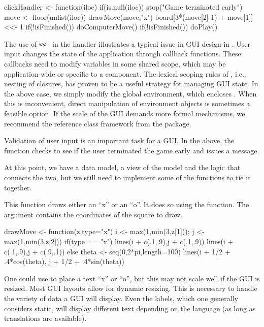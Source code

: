 \begin{Schunk}
\begin{Sinput}
 clickHandler <- function(iloc) {
   if(is.null(iloc)) 
     stop("Game terminated early")
   move <- floor(unlist(iloc))
   drawMove(move,"x")
   board[3*(move[2]-1) + move[1]] <<- 1
   if(!isFinished()) 
     doComputerMove()
   if(!isFinished()) 
     doPlay()
 }
\end{Sinput}
\end{Schunk}

The use of \verb+<<-+ in the handler illustrates a typical issue in
GUI design in \R.  User input changes the state of the application
through callback functions. These callbacks need to modify variables
in some shared scope, which may be
application-wide or specific to a component. The lexical scoping rules
of \R, i.e., nesting of closures, has proven to be a useful strategy
for managing GUI state. In the above case, we simply modify the global
environment, which encloses . When this is
inconvenient, direct manipulation of environment objects is sometimes
a feasible option. If the scale of the GUI demands more formal
mechanisms, we recommend the reference class framework from the
 package.

Validation of user input is an important task for a GUI. In the above,
the  function checks to see if the user
terminated the game early and issues a message.

At this point, we have a data model, a view of the model and the
logic that connects the two, but we still need to implement some of the
functions to tie it together.


This function draws either an ``x'' or an ``o''. It does so using the
 function. The  argument contains the
coordinates of the square to draw.
\begin{Schunk}
\begin{Sinput}
 drawMove <- function(z,type="x") {
   i <- max(1,min(3,z[1])); j <- max(1,min(3,z[2]))
   if(type == "x") {
     lines(i + c(.1,.9),j + c(.1,.9))
     lines(i + c(.1,.9),j + c(.9,.1))
   } else {
     theta <- seq(0,2*pi,length=100)
     lines(i + 1/2 + .4*cos(theta), j + 1/2 + .4*sin(theta))
   }
 }
\end{Sinput}
\end{Schunk}

One could use  to place a text ``x'' or ``o'', but this may
not scale well if the GUI is resized. Most GUI layouts allow for
dynamic resizing. This is necessary to handle the variety of data a
GUI will display. Even the labels, which one generally considers
static, will display different text depending on the language (as long
as translations are available).

